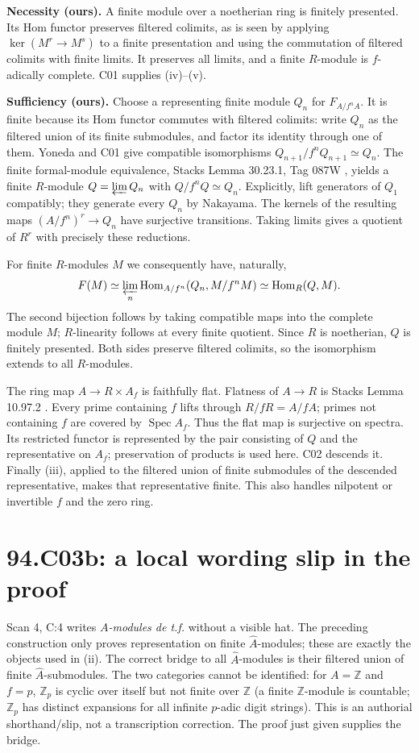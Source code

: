 \documentclass[11pt]{article}
\newcommand{\Hom}{\operatorname{Hom}}
\newcommand{\Spec}{\operatorname{Spec}}
\begin{document}
\textbf{Necessity (ours).}
A finite module over a noetherian ring is finitely presented.
Its Hom functor preserves filtered colimits, as is seen by applying
$\ker(M^r\to M^s)$ to a finite presentation and using the commutation
of filtered colimits with finite limits. It preserves all limits, and
a finite $R$-module is $f$-adically complete. C01 supplies (iv)--(v).

\textbf{Sufficiency (ours).}
Choose a representing finite module $Q_n$ for $F_{A/f^nA}$.
It is finite because its Hom functor commutes with filtered colimits:
write $Q_n$ as the filtered union of its finite submodules, and factor
its identity through one of them. Yoneda and C01 give compatible
isomorphisms $Q_{n+1}/f^n Q_{n+1}\simeq Q_n$.
The finite formal-module equivalence, Stacks Lemma 30.23.1, Tag 087W
\cite{Stacks087W}, yields a finite $R$-module $Q=\varprojlim Q_n$
with $Q/f^nQ\simeq Q_n$. Explicitly, lift generators of $Q_1$
compatibly; they generate every $Q_n$ by Nakayama. The kernels of the
resulting maps $(A/f^n)^r\to Q_n$ have surjective transitions. Taking
limits gives a quotient of $R^r$ with precisely these reductions.

For finite $R$-modules $M$ we consequently have, naturally,
\[
 F(M)\simeq\varprojlim_n\Hom_{A/f^n}(Q_n,M/f^nM)
 \simeq\Hom_R(Q,M).
\]
The second bijection follows by taking compatible maps into the
complete module $M$; $R$-linearity follows at every finite quotient.
Since $R$ is noetherian, $Q$ is finitely presented. Both sides preserve
filtered colimits, so the isomorphism extends to all $R$-modules.

The ring map $A\to R\times A_f$ is faithfully flat. Flatness of $A\to R$
is Stacks Lemma 10.97.2 \cite{StacksCompletion}. Every prime containing
$f$ lifts through $R/fR=A/fA$; primes not containing $f$ are covered by
$\Spec A_f$. Thus the flat map is surjective on spectra.
Its restricted functor is represented by the pair consisting of $Q$
and the representative on $A_f$; preservation of products is used here.
C02 descends it. Finally (iii), applied to the filtered union of finite
submodules of the descended representative, makes that representative
finite. This also handles nilpotent or invertible $f$ and the zero ring.

\section{94.C03b: a local wording slip in the proof}
\label{C03b}
Scan 4, C:4 writes \emph{$A$-modules de t.f.} without a visible hat.
The preceding construction only proves representation on finite
$\widehat A$-modules; these are exactly the objects used in (ii).
The correct bridge to all $\widehat A$-modules is their filtered union
of finite $\widehat A$-submodules. The two categories cannot be
identified: for $A=\mathbb Z$ and $f=p$, $\mathbb Z_p$ is cyclic over
itself but not finite over $\mathbb Z$ (a finite $\mathbb Z$-module is
countable; $\mathbb Z_p$ has distinct expansions for all infinite
$p$-adic digit strings). This is an authorial shorthand/slip, not a
transcription correction. The proof just given supplies the bridge.
\end{document}
